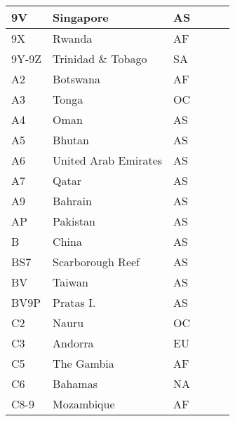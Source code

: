 \documentclass[a4paper]{article}
\begin{document}
\begin{longtable}{|p{1.5cm}|p{4cm}|l|p{2cm}|p{2cm}|p{2cm}|}
\hline
9V                     & Singapore                                  & AS    & & & \\
\hline
9X                     & Rwanda                                     & AF    & & & \\
\hline
9Y-9Z                  & Trinidad \& Tobago                         & SA    & & & \\
\hline
A2                     & Botswana                                   & AF    & & & \\
\hline
A3                     & Tonga                                      & OC    & & & \\
\hline
A4                     & Oman                                       & AS    & & & \\
\hline
A5                     & Bhutan                                     & AS    & & & \\
\hline
A6                     & United Arab Emirates                       & AS    & & & \\
\hline
A7                     & Qatar                                      & AS    & & & \\
\hline
A9                     & Bahrain                                    & AS    & & & \\
\hline
AP                     & Pakistan                                   & AS    & & & \\
\hline
B                      & China                                      & AS    & & & \\
\hline
BS7                    & Scarborough Reef                           & AS    & & & \\
\hline
BV                     & Taiwan                                     & AS    & & & \\
\hline
BV9P                   & Pratas I.                                  & AS    & & & \\
\hline
C2                     & Nauru                                      & OC    & & & \\
\hline
C3                     & Andorra                                    & EU    & & & \\
\hline
C5                     & The Gambia                                 & AF    & & & \\
\hline
C6                     & Bahamas                                    & NA    & & & \\
\hline
C8-9                   & Mozambique                                 & AF    & & & \\

\end{longtable}
\end{document}
